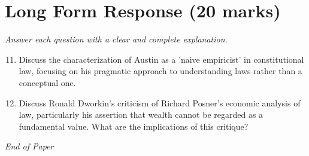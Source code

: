 \documentclass[12pt]{article}
\begin{document}
\section*{Long Form Response (20 marks)}
\textit{Answer each question with a clear and complete explanation.}
\begin{enumerate}[label=\arabic*.]
\setcounter{enumi}{10}
\item Discuss the characterization of Austin as a 'naive empiricist' in constitutional law, focusing on his pragmatic approach to understanding laws rather than a conceptual one.
\item Discuss Ronald Dworkin's criticism of Richard Posner's economic analysis of law, particularly his assertion that wealth cannot be regarded as a fundamental value. What are the implications of this critique?
\end{enumerate}

\vfill
\noindent\textit{End of Paper}
\end{document}
